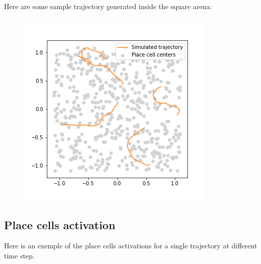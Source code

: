 \documentclass{article}
\begin{document}
Here are some sample trajectory generated inside the square arena:
\begin{figure}[H]
\centering
\includegraphics[scale=0.5]{images/trajectories.png}
\label{trajectory}
\end{figure}

\subsection{Place cells activation}
Here is an exemple of the place cells activations for a single trajectory at different time step.
\end{document}
